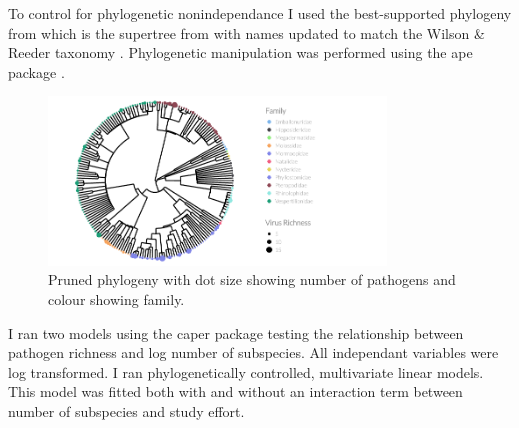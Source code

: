 
To control for phylogenetic nonindependance I used the best-supported phylogeny from \cite{fritz2009geographical} which is the supertree from \cite{bininda2007delayed} with names updated to match the Wilson \& Reeder taxonomy \cite{wilson2005mammal}.
Phylogenetic manipulation was performed using the ape package \cite{ape}.




\begin{knitrout}\footnotesize
{}\color{fgcolor}\begin{figure}[t]

{\centering \includegraphics[width=0.8\textwidth]{figure/treePlot-1} 

}

\caption[Pruned phylogeny with dot size showing number of pathogens and colour showing family]{Pruned phylogeny with dot size showing number of pathogens and colour showing family.}\label{fig:treePlot}
\end{figure}


\end{knitrout}













I ran two models using the caper package \cite{caper} testing the relationship between pathogen richness and log number of subspecies.
All independant variables were log transformed.
I ran phylogenetically controlled, multivariate linear models.
This model was fitted both with and without an interaction term between number of subspecies and study effort.











